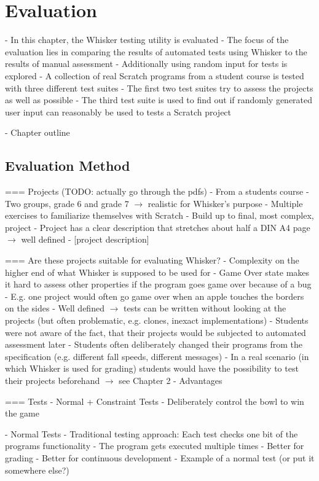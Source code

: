 \chapter{Evaluation}

- In this chapter, the Whisker testing utility is evaluated
- The focus of the evaluation lies in comparing the results of automated tests using Whisker to the results of manual assessment
- Additionally using random input for tests is explored
- A collection of real Scratch programs from a student course is tested with three different test suites
- The first two test suites try to assess the projects as well as possible
- The third test suite is used to find out if randomly generated user input can reasonably be used to tests a Scratch project

- Chapter outline

\section{Evaluation Method}
=== Projects (TODO: actually go through the pdfs)
- From a students course
- Two groups, grade 6 and grade 7 $\rightarrow$ realistic for Whisker's purpose
- Multiple exercises to familiarize themselves with Scratch
- Build up to final, most complex, project
- Project has a clear description that stretches about half a DIN A4 page $\rightarrow$ well defined
- [project description]

=== Are these projects suitable for evaluating Whisker?
- Complexity on the higher end of what Whisker is supposed to be used for
- Game Over state makes it hard to assess other properties if the program goes game over because of a bug
    - E.g. one project would often go game over when an apple touches the borders on the sides
    - Well defined $\rightarrow$ tests can be written without looking at the projects (but often problematic, e.g. clones, inexact implementations)
- Students were not aware of the fact, that their projects would be subjected to automated assessment later
    - Students often deliberately changed their programs from the specification (e.g. different fall speeds, different messages)
    - In a real scenario (in which Whisker is used for grading) students would have the possibility to test their projects beforehand
    $\rightarrow$ see Chapter 2 - Advantages

=== Tests
- Normal + Constraint Tests
    - Deliberately control the bowl to win the game

- Normal Tests
    - Traditional testing approach: Each test checks one bit of the programs functionality
    - The program gets executed multiple times
    - Better for grading
    - Better for continuous development
    - Example of a normal test (or put it somewhere else?)


